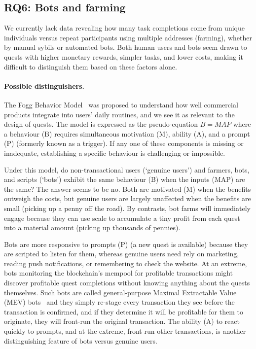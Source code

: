 \subsection{RQ6: Bots and farming}

We currently lack data revealing how many task completions come from unique individuals versus repeat participants using multiple addresses (farming), whether by manual sybils or automated bots. Both human users and bots seem drawn to quests with higher monetary rewards, simpler tasks, and lower costs, making it difficult to distinguish them based on these factors alone.

\paragraph{Possible distinguishers.} The Fogg Behavior Model~\cite{Fogg09} was proposed to understand how well commercial products integrate into users’ daily routines, and we see it as relevant to the design of quests. The model is expressed as the pseudo-equation $B=MAP$ where a behaviour (B) requires simultaneous motivation (M), ability (A), and a prompt (P) (formerly known as a trigger). If any one of these components is missing or inadequate, establishing a specific behaviour is challenging or impossible.

Under this model, do non-transactional users (`genuine users') and farmers, bots, and scripts (`bots') exhibit the same behaviour (B) when the inputs (MAP) are the same? The answer seems to be no. Both are motivated (M) when the benefits outweigh the costs, but genuine users are largely unaffected when the benefits are small (\cf picking up a penny off the road). By contrasts, bot farms will immediately engage because they can use scale to accumulate a tiny profit from each quest into a material amount (\cf picking up thousands of pennies).

Bots are more responsive to prompts (P) (\eg a new quest is available) because they are scripted to listen for them, whereas genuine users need rely on marketing, reading push notifications, or remembering to check the website. At an extreme, bots monitoring the blockchain's mempool for profitable transactions might discover profitable quest completions without knowing anything about the quests themselves. Such bots are called general-purpose Maximal Extractable Value (MEV) bots~\cite{DGK+20} and they simply re-stage every transaction they see before the transaction is confirmed, and if they determine it will be profitable for them to originate, they will front-run the original transaction. The ability (A) to react quickly to prompts, and at the extreme, front-run other transactions, is another distinguishing feature of bots versus genuine users. 


